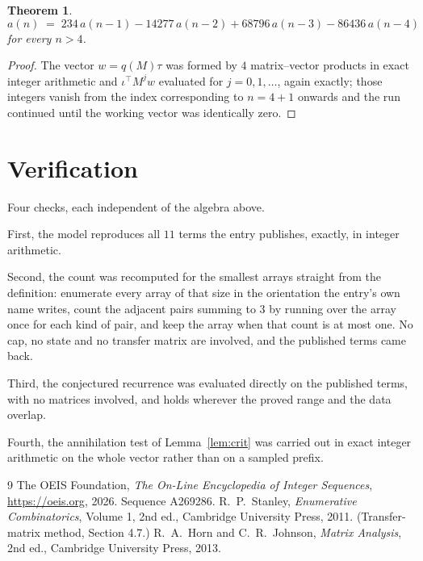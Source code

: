 \documentclass[11pt,a4paper]{article}
\theoremstyle{plain}
\newtheorem{theorem}{Theorem}
\theoremstyle{definition}
\begin{document}
\begin{theorem}
\[
a(n)\;=\;234\,a(n-1) - 14277\,a(n-2) + 68796\,a(n-3) - 86436\,a(n-4)
\]
for every $n>4$.
\end{theorem}

\begin{proof}
The vector $w=q(M)\tau$ was formed by $4$ matrix--vector products in exact integer
arithmetic and $\iota^{\!\top}M^{j}w$ evaluated for $j=0,1,\dots$, again exactly; those
integers vanish from the index corresponding to $n=4+1$ onwards and the run continued
until the working vector was identically zero.
\end{proof}

\section{Verification}

Four checks, each independent of the algebra above.

First, the model reproduces all $11$ terms the entry publishes, exactly, in integer
arithmetic.

Second, the count was recomputed for the smallest arrays straight from the definition:
enumerate every array of that size in the orientation the entry's own name writes, count the
adjacent pairs summing to $3$ by running over the array once for each kind of pair, and keep
the array when that count is at most one. No cap, no state and no transfer matrix are involved, and
the published terms came back.

Third, the conjectured recurrence was evaluated directly on the published terms, with no
matrices involved, and holds wherever the proved range and the data overlap.

Fourth, the annihilation test of Lemma~\ref{lem:crit} was carried out in exact integer
arithmetic on the whole vector rather than on a sampled prefix.

\begin{thebibliography}{9}
 The OEIS Foundation, \emph{The On-Line Encyclopedia of Integer
Sequences}, \url{https://oeis.org}, 2026. Sequence A269286.
 R.~P.~Stanley, \emph{Enumerative Combinatorics}, Volume 1, 2nd ed.,
Cambridge University Press, 2011. (Transfer-matrix method, Section 4.7.)
 R.~A.~Horn and C.~R.~Johnson, \emph{Matrix Analysis}, 2nd ed., Cambridge
University Press, 2013.
\end{thebibliography}
\end{document}
